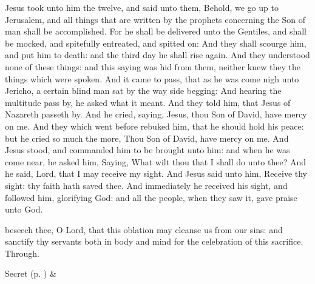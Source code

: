 
 Jesus took unto him the twelve, and said unto them, Behold, we go up to Jerusalem, and all things that are written by the prophets concerning the Son of man shall be accomplished. For he shall be delivered unto the Gentiles, and shall be mocked, and spitefully entreated, and spitted on: And they shall scourge him, and put him to death: and the third day he shall rise again. And they understood none of these things: and this saying was hid from them, neither knew they the things which were spoken. And it came to pass, that as he was come nigh unto Jericho, a certain blind man sat by the way side begging: And hearing the multitude pass by, he asked what it meant. And they told him, that Jesus of Nazareth passeth by. And he cried, saying, Jesus, thou Son of David, have mercy on me. And they which went before rebuked him, that he should hold his peace: but he cried so much the more, Thou Son of David, have mercy on me. And Jesus stood, and commanded him to be brought unto him: and when he was come near, he asked him, Saying, What wilt thou that I shall do unto thee? And he said, Lord, that I may receive my sight. And Jesus said unto him, Receive thy sight: thy faith hath saved thee. And immediately he received his sight, and followed him, glorifying God: and all the people, when they saw it, gave praise unto God.


\secret
{} beseech thee, O Lord, that this oblation may cleanse us from our sins: and sanctify thy servants both in body and mind for the celebration of this sacrifice. Through.
\begin{rubric}
     Secret  (p. \pageref{SPSaints}) \&  
\end{rubric}


